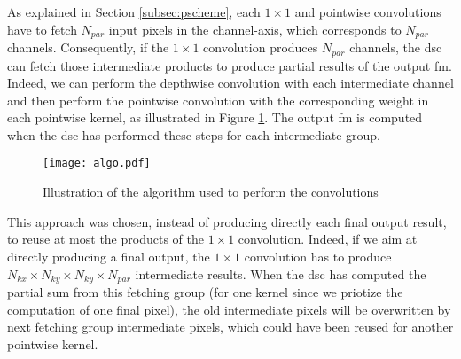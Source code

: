 As explained in Section \ref{subsec:pscheme}, each $1 \times 1$ and pointwise convolutions have to fetch $N_{par}$ input pixels in the channel-axis, which corresponds to $N_{par}$ channels. Consequently, if the $1 \times 1$ convolution produces $N_{par}$ channels, the \acrshort{dsc} can fetch those intermediate products to produce partial results of the output \acrshort{fm}. Indeed, we can perform the depthwise convolution with each intermediate channel and then perform the pointwise convolution with the corresponding weight in each pointwise kernel, as illustrated in Figure \ref{fig:algo}. The output \acrshort{fm} is computed when the \acrshort{dsc} has performed these steps for each intermediate group.
%
\begin{figure}[H]
    \centering
    \texttt{[image: algo.pdf]}
    \caption{Illustration of the algorithm used to perform the convolutions}
    \label{fig:algo}
\end{figure}

This approach was chosen, instead of producing directly each final output result, to reuse at most the products of the $1 \times 1$ convolution. Indeed, if we aim at directly producing a final output, the $1 \times 1$ convolution has to produce $N_{kx} \times N_{ky} \times N_{ky} \times N_{par}$ intermediate results. When the \acrshort{dsc} has computed the partial sum from this fetching group (for one kernel since we priotize the computation of one final pixel), the old intermediate pixels will be overwritten by next fetching group intermediate pixels, which could have been reused for another pointwise kernel.

